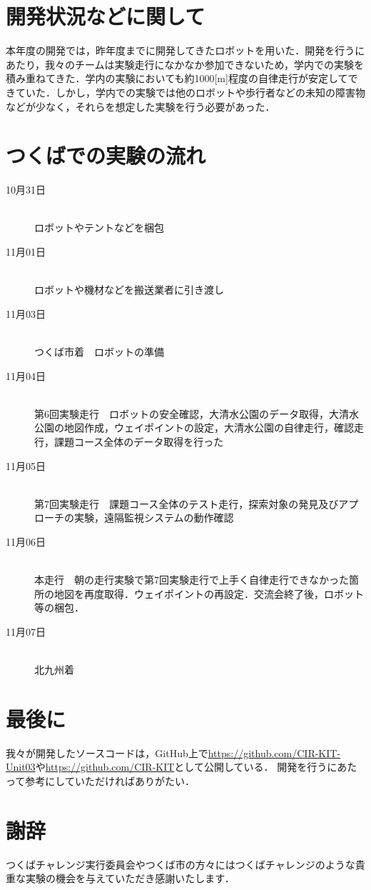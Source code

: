 \documentclass[10pt,a4paper]{jarticle}
\begin{document}
\section{開発状況などに関して}
本年度の開発では，昨年度までに開発してきたロボットを用いた．開発を行うにあたり，我々のチームは実験走行になかなか参加できないため，学内での実験を積み重ねてきた．学内の実験においても約1000[m]程度の自律走行が安定してできていた．しかし，学内での実験では他のロボットや歩行者などの未知の障害物などが少なく，それらを想定した実験を行う必要があった．

\section{つくばでの実験の流れ}
\begin{description}
 \item[10月31日]\mbox{}\\
	    ロボットやテントなどを梱包
 \item[11月01日]\mbox{}\\
	    ロボットや機材などを搬送業者に引き渡し
 \item[11月03日]\mbox{}\\
	    つくば市着　ロボットの準備
 \item[11月04日]\mbox{}\\
	    第6回実験走行　ロボットの安全確認，大清水公園のデータ取得，大清水公園の地図作成，ウェイポイントの設定，大清水公園の自律走行，確認走行，課題コース全体のデータ取得を行った
 \item[11月05日]\mbox{}\\
	    第7回実験走行　課題コース全体のテスト走行，探索対象の発見及びアプローチの実験，遠隔監視システムの動作確認
 \item[11月06日]\mbox{}\\
	    本走行　朝の走行実験で第7回実験走行で上手く自律走行できなかった箇所の地図を再度取得．ウェイポイントの再設定．交流会終了後，ロボット等の梱包．
 \item[11月07日]\mbox{}\\
	    北九州着
\end{description}

\section{最後に}
我々が開発したソースコードは，GitHub上で\url{https://github.com/CIR-KIT-Unit03}や\url{https://github.com/CIR-KIT}として公開している．
開発を行うにあたって参考にしていただければありがたい．


\section*{謝辞}
つくばチャレンジ実行委員会やつくば市の方々にはつくばチャレンジのような貴重な実験の機会を与えていただき感謝いたします．
\end{document}
